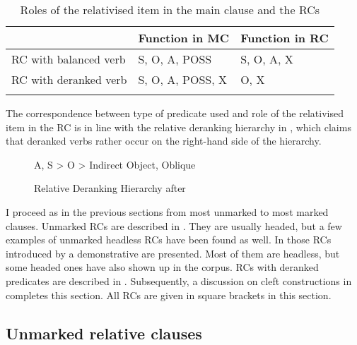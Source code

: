 \begin{table}
\begin{tabularx}{.8\textwidth}{QQl}
\lsptoprule
& Function in MC & Function in RC\\
\midrule
RC with balanced verb & S, O, A, POSS & S, O, A, X\\
RC with deranked verb & S, O, A, POSS, X & O, X\\
\lspbottomrule
\end{tabularx}

\caption{Roles of the relativised item in the main clause and the RCs}
\label{tab:RelativeClausesRoles}
\end{table}


The correspondence between type of predicate used and role of the relativised item in the RC is in line with the relative deranking hierarchy in , which claims that deranked verbs rather occur on the right-hand side of the hierarchy.

\begin{figure}

A, S > O > Indirect Object, Oblique

\caption{Relative Deranking Hierarchy after \citet[203]{Cristofaro2003}}
\label{fig:RelativDeranking}
\end{figure}

I proceed as in the previous sections from most unmarked to most marked clauses. Unmarked RCs are described in . They are usually headed, but a few examples of unmarked headless RCs have been found as well. In  those RCs introduced by a demonstrative are presented. Most of them are headless, but some headed ones have also shown up in the corpus. RCs with deranked predicates are described in . 
Subsequently, a discussion on cleft constructions in  completes this section. All RCs are given in square brackets in this section.

\subsection{Unmarked relative clauses}\label{sec:UnmarkedRC}

